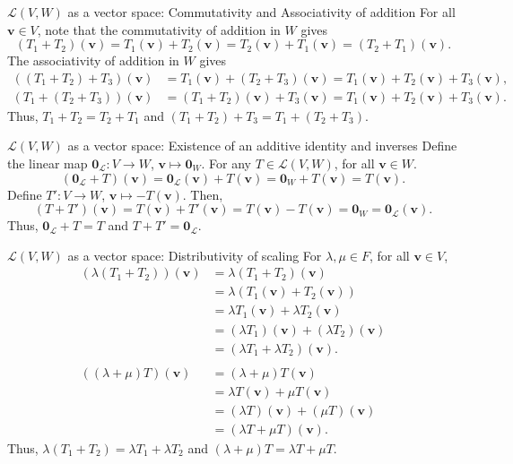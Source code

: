 \documentclass{beamer}
\def\v{\bm{v}}
\def\L{\mathcal{L}}
\begin{document}
        \begin{frame}{$\L(V, W)$ as a vector space: Commutativity and Associativity of addition}
                For all $\v\in V$, note that the commutativity of addition in $W$ gives
                \[
                        (T_1 + T_2)(\v) = T_1(\v) + T_2(\v) = T_2(\v) + T_1(\v) = (T_2 + T_1)(\v).
                \]
                The associativity of addition in $W$ gives
                \begin{align*}
                        ((T_1 + T_2) + T_3)(\v) &= T_1(\v) + (T_2 + T_3)(\v) = T_1(\v) + T_2(\v) + T_3(\v), \\
                        (T_1 + (T_2 + T_3))(\v) &= (T_1 + T_2)(\v) + T_3(\v) = T_1(\v) + T_2(\v) + T_3(\v).
                \end{align*}
                Thus, $T_1 + T_2 = T_2 + T_1$ and $(T_1 + T_2) + T_3 = T_1 + (T_2 + T_3)$.
        \end{frame}

        \begin{frame}{$\L(V, W)$ as a vector space: Existence of an additive identity and inverses}
                Define the linear map $\mathbf{0}_\L\colon V \to W$, $\v \mapsto \mathbf{0}_W$. For any $T \in \L(V, W)$, for all $\v \in W$.
                \[
                        (\mathbf{0}_\L + T)(\v) = \mathbf{0}_\L(\v) + T(\v) = \mathbf{0}_W + T(\v) = T(\v).
                \]
                Define $T'\colon V \to W$, $\v \mapsto -T(\v)$. Then,
                \[
                        (T + T')(\v) = T(\v) + T'(\v) = T(\v) - T(\v) = \mathbf{0}_W = \mathbf{0}_\L(\v).
                \]
                Thus, $\mathbf{0}_\L + T = T$ and $T + T' = \mathbf{0}_\L$.
        \end{frame}
        
        \begin{frame}{$\L(V, W)$ as a vector space: Distributivity of scaling}
                For $\lambda, \mu \in F$, for all $\v \in V$,
                \begin{align*}
                        (\lambda (T_1 + T_2))(\v) &= \lambda (T_1 + T_2)(\v) \\
                                &= \lambda(T_1(\v) + T_2(\v)) \\
                                &= \lambda T_1(\v) + \lambda T_2(\v) \\
                                &= (\lambda T_1)(\v) + (\lambda T_2)(\v) \\
                                &= (\lambda T_1 + \lambda T_2)(\v). \\\\
                        ((\lambda + \mu)T)(\v) &= (\lambda + \mu)T(\v) \\
                                &= \lambda T(\v) + \mu T(\v) \\
                                &= (\lambda T)(\v) + (\mu T)(\v) \\
                                &= (\lambda T + \mu T)(\v).
                \end{align*}
                Thus, $\lambda (T_1 + T_2) = \lambda T_1 + \lambda T_2$ and $(\lambda + \mu)T = \lambda T + \mu T$.
        \end{frame}
        
\end{document}
